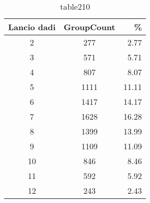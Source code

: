 \begin{table}[h]%
\centering%
\begin{tabular}{ccr}%
\toprule%
\textbf{Lancio dadi}&\textbf{GroupCount}&\textbf{\%}\\
\hline%
2 & 277 & 2.77 \\ 
3 & 571 & 5.71 \\ 
4 & 807 & 8.07 \\ 
5 & 1111 & 11.11 \\ 
6 & 1417 & 14.17 \\ 
7 & 1628 & 16.28 \\ 
8 & 1399 & 13.99 \\ 
9 & 1109 & 11.09 \\ 
10 & 846 & 8.46 \\ 
11 & 592 & 5.92 \\ 
12 & 243 & 2.43 \\ 
\hline%
\end{tabular}%
\caption{table210}%
\label{tab:table210}%
\end{table}%